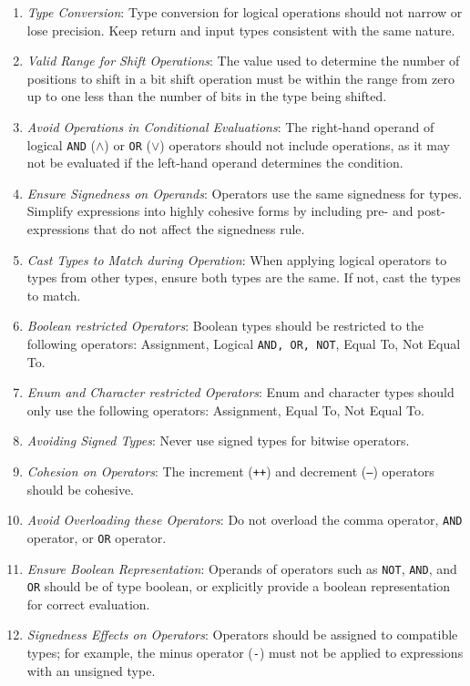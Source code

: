 \documentclass[9pt]{IEEEtran} %
\begin{document}
\begin{enumerate}
  \item \textit{Type Conversion}: Type conversion for logical operations should not narrow or lose precision. Keep return and input types consistent with the same nature. 
  \item \textit{Valid Range for Shift Operations}: The value used to determine the number of positions to shift in a bit shift operation must be within the range from zero up to one less than the number of bits in the type being shifted.
  \item \textit{Avoid Operations in Conditional Evaluations}: The right-hand operand of logical \texttt{AND} ($\wedge$) or \texttt{OR} ($\vee$) operators should not include operations, as it may not be evaluated if the left-hand operand determines the condition.
  \item \textit{Ensure Signedness on Operands}: Operators use the same signedness for types. Simplify expressions into highly cohesive forms by including pre- and post-expressions that do not affect the signedness rule.
  \item \textit{Cast Types to Match during Operation}: When applying logical operators to types from other types, ensure both types are the same. If not, cast the types to match.
  \item \textit{Boolean restricted Operators}: Boolean types should be restricted to the following operators: Assignment, Logical \texttt{AND, OR, NOT}, Equal To, Not Equal To.
  \item \textit{Enum and Character restricted Operators}: Enum and character types should only use the following operators: Assignment, Equal To, Not Equal To.
  \item \textit{Avoiding Signed Types}: Never use signed types for bitwise operators.
  \item \textit{Cohesion on Operators}: The increment (\texttt{++}) and decrement (\texttt{--}) operators should be cohesive. 
  \item \textit{Avoid Overloading these Operators}: Do not overload the comma operator, \texttt{AND} operator, or \texttt{OR} operator.
  \item \textit{Ensure Boolean Representation}: Operands of operators such as \texttt{NOT}, \texttt{AND}, and \texttt{OR} should be of type boolean, or explicitly provide a boolean representation for correct evaluation.
  \item \textit{Signedness Effects on Operators}: Operators should be assigned to compatible types; for example, the minus operator (\texttt{-}) must not be applied to expressions with an unsigned type.

\end{enumerate}
\end{document}
